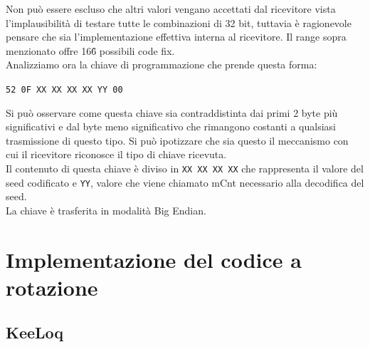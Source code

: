 Non può essere escluso che altri valori vengano accettati dal ricevitore vista l’implausibilità di testare tutte le combinazioni di 32 bit, tuttavia è ragionevole pensare che sia l’implementazione effettiva interna al ricevitore. Il range sopra menzionato offre 16\^6 possibili code fix.\\
Analizziamo ora la chiave di programmazione che prende questa forma:
\begin{center}
  \texttt{52 0F XX XX XX XX YY 00}
\end{center}
Si può osservare come questa chiave sia contraddistinta dai primi 2 byte più significativi e dal byte meno significativo che rimangono costanti a qualsiasi trasmissione di questo tipo. Si può ipotizzare che sia questo il meccanismo con cui il ricevitore riconosce il tipo di chiave ricevuta.\\
Il contenuto di questa chiave è diviso in \texttt{XX XX XX XX} che rappresenta il valore del seed codificato e \texttt{YY}, valore che viene chiamato mCnt necessario alla decodifica del seed.\\
La chiave è trasferita in modalità Big Endian.

\section{Implementazione del codice a rotazione}
\label{sec:rolling}

\subsection{KeeLoq}
\label{sub:keeloq}

